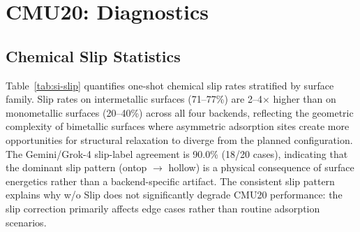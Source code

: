 \documentclass[%
 preprint,
 superscriptaddress,
 amsmath,amssymb,
 aps,
 prb,
 floatfix,
]{revtex4-2}
\begin{document}

\section{CMU20: Diagnostics}

\subsection{Chemical Slip Statistics}

\begin{table}[ht]
\centering
\caption{One-shot Chemical Slip rates by surface family on CMU20. Entries are slip events divided by valid one-shot runs for each backend.}
\label{tab:si-slip}
\end{table}

Table~\ref{tab:si-slip} quantifies one-shot chemical slip rates stratified by surface family. Slip rates on intermetallic surfaces (71--77\%) are 2--4$\times$ higher than on monometallic surfaces (20--40\%) across all four backends, reflecting the geometric complexity of bimetallic surfaces where asymmetric adsorption sites create more opportunities for structural relaxation to diverge from the planned configuration. The Gemini/Grok-4 slip-label agreement is 90.0\% (18/20 cases), indicating that the dominant slip pattern (ontop $\rightarrow$ hollow) is a physical consequence of surface energetics rather than a backend-specific artifact. The consistent slip pattern explains why w/o Slip does not significantly degrade CMU20 performance: the slip correction primarily affects edge cases rather than routine adsorption scenarios.
\end{document}
